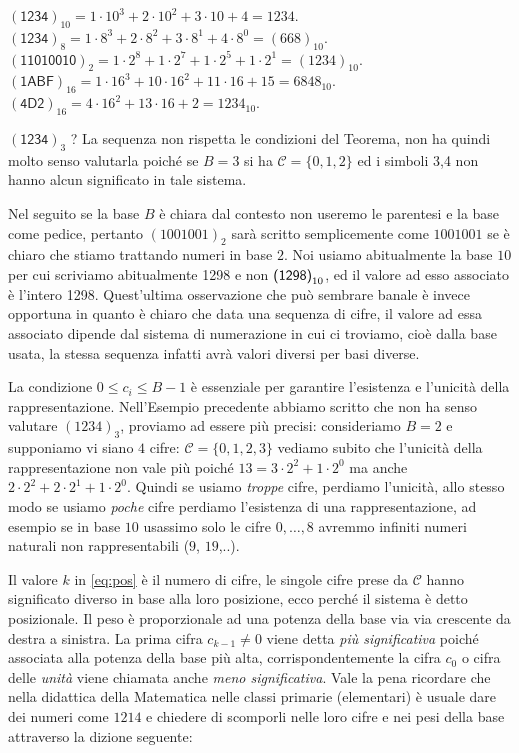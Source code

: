 \begin{ex} $(\textsf{1234})_{10} = 1\cdot 10^3+2\cdot 10^2 + 3 \cdot 10 + 4 =
1234$. $(\textsf{1234})_8 = 1\cdot 8^3+2\cdot 8^2+3\cdot 8^1+4\cdot 8^0 =
(668)_{10}$. $(\textsf{11010010})_2 = 1\cdot 2^8 + 1\cdot 2^7 + 1\cdot 2^5 +
1\cdot 2^1 = (1234)_{10}$. $(\textsf{1ABF})_{16} = 1\cdot 16^3 + 10\cdot 16^2 +
11 \cdot 16 + 15 = 6848_{10}$. $(\textsf{4D2})_{16} = 4\cdot 16^2 + 13\cdot 16
+ 2 = 1234_{10}$.

\noindent $(\textsf{1234})_3$ ? La sequenza non rispetta le condizioni del
Teorema, non ha quindi molto senso valutarla poiché se $B = 3$ si ha
$\mathcal{C} = \{ 0, 1, 2 \}$ ed i simboli \textsf{3,4} non hanno alcun
significato in tale sistema. \end{ex}

Nel seguito se la base $B$ è chiara dal contesto non useremo le parentesi e la
base come pedice, pertanto $ (1001001)_2$ sarà scritto semplicemente come
$1001001$ se è chiaro che stiamo trattando numeri in base $2$. Noi usiamo
abitualmente la base $10$ per cui scriviamo abitualmente \textsf{1298} e non
$\mbox{\textsf{(1298)}}_{10}$, ed il valore ad esso associato è l'intero 1298.
Quest'ultima osservazione che può sembrare banale è invece opportuna in quanto
è chiaro che data una sequenza di cifre, il valore ad essa associato dipende
dal sistema di numerazione in cui ci troviamo, cioè dalla base usata, la stessa
sequenza infatti avrà valori diversi per basi diverse.

La condizione $0 \leq c_i \leq B-1$ è essenziale per garantire l'esistenza e l'unicità
della rappresentazione. Nell'Esempio precedente abbiamo scritto che non ha
senso valutare $(1234)_3$, proviamo ad essere più precisi: consideriamo $B = 2$
e supponiamo vi siano $4$ cifre: $\mathcal{C} = \{ 0, 1, 2, 3 \}$ vediamo
subito che l'unicità della rappresentazione non vale più poiché $13 = 3\cdot
2^2 + 1 \cdot 2^0$ ma anche $2\cdot 2^2 + 2\cdot 2^1 + 1\cdot 2^0$. Quindi se
usiamo \emph{troppe} cifre, perdiamo l'unicità, allo stesso modo se usiamo
\emph{poche} cifre perdiamo l'esistenza di una rappresentazione, ad esempio se
in base $10$ usassimo solo le cifre $0,\ldots,8$ avremmo infiniti numeri
naturali non rappresentabili ($9$, $19$,..).

Il valore $k$ in \eqref{eq:pos} è il numero di cifre, le singole cifre prese da
$\mathcal{C}$ hanno significato diverso in base alla loro posizione, ecco
perché il sistema è detto posizionale. Il peso è proporzionale ad una potenza
della base via via crescente da destra a sinistra. La prima cifra $c_{k-1} \neq
0$ viene detta \emph{più significativa} poiché associata alla potenza della
base più alta, corrispondentemente la cifra $c_0$ o cifra delle \emph{unità}
viene chiamata anche \emph{meno significativa}. Vale la pena ricordare che
nella didattica della Matematica nelle classi primarie (elementari) è usuale
dare dei numeri come $1214$ e chiedere di scomporli nelle loro cifre e nei pesi
della base attraverso la dizione seguente:

